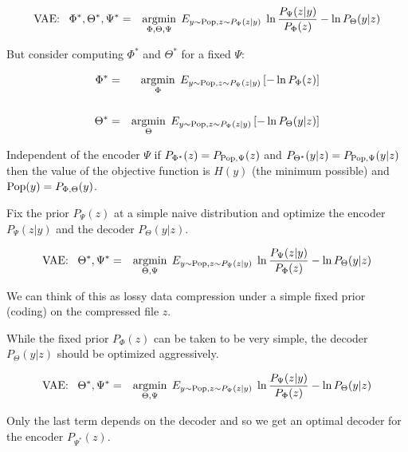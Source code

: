 {

{\huge
\begin{eqnarray*}
\mbox{VAE:}\;\;\;\Phi^*,\Theta^*,\Psi^* &  = & \operatorname*{argmin}_{\Phi,\Theta,\Psi}\;E_{y\sim \mathrm{Pop},z\sim P_\Psi(z|y)}  \;\ln \frac{P_\Psi(z|y)}{P_\Phi(z)}  - \ln P_\Theta(y|z)
\end{eqnarray*}

But consider computing $\Phi^*$ and $\Theta^*$ for a fixed $\Psi$:

\begin{eqnarray*}
\Phi^* & = & \operatorname*{argmin}_\Phi\;E_{y \sim \mathrm{Pop},z \sim P_\Psi(z|y)}\left[ -\ln P_\Phi(z)\right] \\
\\
\Theta^* & = & \operatorname*{argmin}  _\Theta\; E_{y \sim \mathrm{Pop},z \sim P_\Psi(z|y)}\left[-\ln P_\Theta(y|z)\right]
\end{eqnarray*}

\vfill
{\color{red} Independent of the encoder $\Psi$} if $P_{\Phi^*}(z) = P_{\mathrm{Pop},\Psi}(z)$ and $P_{\Theta^*}(y|z) = P_{\mathrm{Pop},\Psi}(y|z)$ then the value of the objective function
is $H(y)$ (the minimum possible) and $\mathrm{Pop}(y) = P_{\Phi,\Theta}(y)$.

}


Fix the prior $P_\Psi(z)$ at a simple naive distribution and optimize the encoder $P_\Psi(z|y)$ and the decoder $P_\Theta(y|z)$.

{\huge
\begin{eqnarray*}
\mbox{VAE:}\;\;\;\Theta^*,\Psi^* &  = & \operatorname*{argmin}_{\Theta,\Psi}\;E_{y\sim \mathrm{Pop},z\sim P_\Psi(z|y)}  \;\ln \frac{P_\Psi(z|y)}{P_\Phi(z)}  - \ln P_\Theta(y|z)
\end{eqnarray*}
}

We can think of this as lossy data compression under a simple fixed prior (coding) on the compressed file $z$.

\vfill
While the fixed prior $P_\Phi(z)$ can be taken to be very simple, the decoder $P_\Theta(y|z)$ should be optimized aggressively.


{\huge
\begin{eqnarray*}
\mbox{VAE:}\;\;\;\Theta^*,\Psi^* &  = & \operatorname*{argmin}_{\Theta,\Psi}\;E_{y\sim \mathrm{Pop},z\sim P_\Psi(z|y)}  \;\ln \frac{P_\Psi(z|y)}{P_\Phi(z)}  - \ln P_\Theta(y|z)
\end{eqnarray*}
}

\vfill
{\huge
Only the last term depends on the decoder and so we get an optimal decoder for the encoder $P_{\Psi^*}(z)$.

}}

